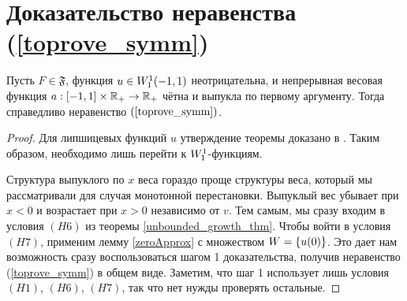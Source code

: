 \section{Доказательство неравенства (\ref{toprove_symm})}
\label{sobolevSymm}

\begin{thm}
\label{symmThm}
Пусть $F \in \mathfrak{F}$, функция $u \in W_1^1(-1, 1)$ неотрицательна,
и непрерывная весовая функция $a: [-1, 1] \times \mathbb R_+ \to \mathbb R_+$ чётна и выпукла по первому аргументу.
Тогда справедливо неравенство $(\ref{toprove_symm})$.
\end{thm}

\begin{proof}
Для липшицевых функций $u$ утверждение теоремы доказано в \cite{Brock}.
Таким образом, необходимо лишь перейти к $W_1^1$-функциям.

Структура выпуклого по $x$ веса гораздо проще структуры веса,
который мы рассматривали для случая монотонной перестановки.
Выпуклый вес убывает при $x < 0$ и возрастает при $x > 0$ независимо от $v$.
Тем самым, мы сразу входим в условия $(H6)$ из теоремы \ref{unbounded_growth_thm}.
Чтобы войти в условия $(H7)$, применим лемму \ref{zeroApprox} с множеством $W = \{u(0)\}$.
Это дает нам возможность сразу воспользоваться шагом 1 доказательства,
получив неравенство (\ref{toprove_symm}) в общем виде.
Заметим, что шаг 1 использует лишь условия $(H1)$, $(H6)$, $(H7)$, так что нет нужды проверять остальные.
\end{proof}
